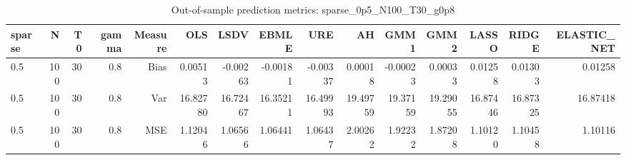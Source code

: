 \begin{table}[!htbp]\centering
\caption{Out-of-sample prediction metrics: sparse_0p5_N100_T30_g0p8}
\label{tab:table3_sparse_0p5_N100_T30_g0p8}
\begin{tabular}{lrrrrrrrrrrrrrr}
\hline
sparse & N & T0 & gamma & Measure & OLS & LSDV & EBMLE & URE & AH & GMM1 & GMM2 & LASSO & RIDGE & ELASTIC_NET \\
\hline
0.5 & 100 & 30 & 0.8 & Bias & 0.00513 & -0.00263 & -0.00181 & -0.00337 & 0.00018 & -0.00023 & 0.00033 & 0.01258 & 0.01303 & 0.01258 \\
0.5 & 100 & 30 & 0.8 & Var & 16.82780 & 16.72467 & 16.35211 & 16.49993 & 19.49759 & 19.37159 & 19.29055 & 16.87446 & 16.87325 & 16.87418 \\
0.5 & 100 & 30 & 0.8 & MSE & 1.12046 & 1.06566 & 1.06441 & 1.06437 & 2.00262 & 1.92232 & 1.87208 & 1.10120 & 1.10458 & 1.10116 \\
\hline
\end{tabular}
\end{table}

